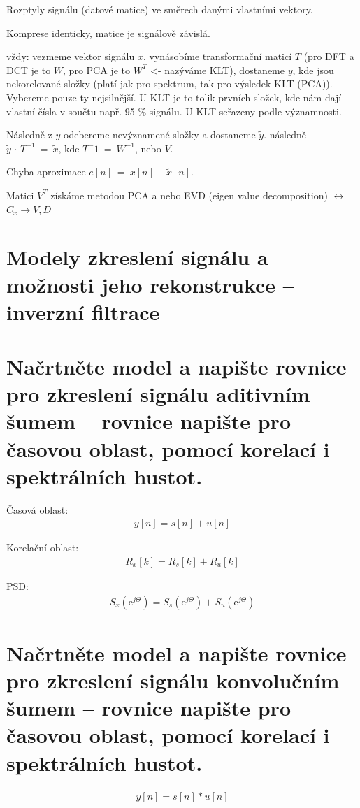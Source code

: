 \documentclass[a4paper,12pt]{article}   %
\newcommand{\ejt}{\text{e}^{j\Theta}}
\newcommand{\okruh}[1]{\section*{\Large #1}}
\begin{document}
Rozptyly signálu (datové matice) ve směrech danými vlastními vektory.

Komprese identicky, matice je signálově závislá.

vždy:
vezmeme vektor signálu $x$, vynásobíme transformační maticí $T$ (pro DFT a DCT je to $W$, pro PCA je to $W^T$ <- nazýváme KLT), dostaneme $y$, kde jsou nekorelované složky (platí jak pro spektrum, tak pro výsledek KLT (PCA)). Vybereme pouze ty nejsilnější. U KLT je to tolik prvních složek, kde nám dají vlastní čísla v součtu např. 95 \% signálu. U KLT seřazeny podle významnosti.

Následně z $y$ odebereme nevýznamené složky a dostaneme $\tilde{y}$. následně $\tilde{y}\,\cdot\,T^{-1}~=~\tilde{x}$, kde $T^-1~=~W^{-1}$, nebo $V$. 

Chyba aproximace $e[n]~=~x[n] - \tilde{x}[n]$.

Matici $V^T$ získáme metodou PCA a nebo EVD (eigen value decomposition) $\leftrightarrow$ $C_x \rightarrow V, D$


\clearpage

\okruh{Modely zkreslení signálu a možnosti jeho rekonstrukce – inverzní filtrace}
\section{Načrtněte model a napište rovnice pro zkreslení signálu aditivním šumem – rovnice napište pro časovou oblast, pomocí korelací i spektrálních hustot.}

Časová oblast:
\begin{align*}
        y[n] = s[n] + u[n]
\end{align*}

Korelační oblast:
\begin{align*}
        R_x[k] = R_s[k] + R_u[k]
\end{align*}

PSD:
\begin{align*}
        S_x(\ejt) = S_s(\ejt) + S_u(\ejt)
\end{align*}


\section{Načrtněte model a napište rovnice pro zkreslení signálu konvolučním šumem – rovnice napište pro časovou oblast, pomocí korelací i spektrálních hustot.}
\begin{align*}
        y[n] = s[n]\ast u[n]
\end{align*}
\end{document}
